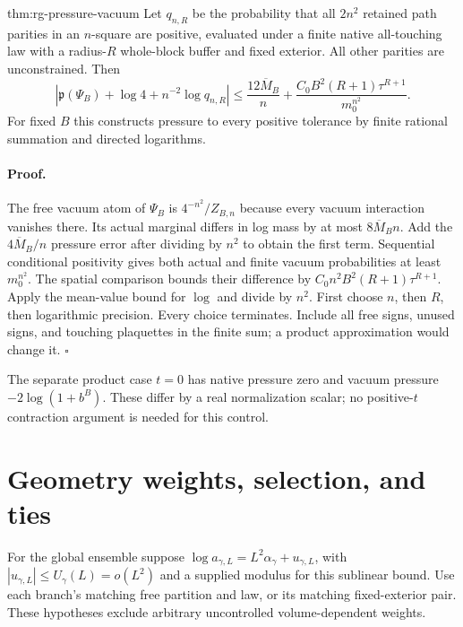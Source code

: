 {thm:rg-pressure-vacuum}
Let $q_{n,R}$ be the probability that all $2n^2$ retained path parities
in an $n$-square are positive, evaluated under a finite native all-touching
law with a radius-$R$ whole-block buffer and fixed exterior. All other
parities are unconstrained. Then
\begin{equation}
 \left|\mathfrak p(\Psi_B)+\log4+n^{-2}\log q_{n,R}\right|
 \leq\frac{12\overline M_B}{n}
       +\frac{C_0B^2(R+1)\tau^{R+1}}{m_0^{n^2}}.
 \label{eq:rg-pressure-vacuum-oracle}
\end{equation}
For fixed $B$ this constructs pressure to every positive tolerance by
finite rational summation and directed logarithms. 

\paragraph{Proof.}
The free vacuum atom of $\Psi_B$ is $4^{-n^2}/Z_{B,n}$ because every
vacuum interaction vanishes there. Its actual marginal differs in log
mass by at most $8\overline M_Bn$. Add the $4\overline M_B/n$ pressure
error after dividing by $n^2$ to obtain the first term. Sequential
conditional positivity gives both actual and finite vacuum probabilities
at least $m_0^{n^2}$. The spatial comparison bounds their difference by
$C_0n^2B^2(R+1)\tau^{R+1}$. Apply the mean-value bound for $\log$ and
divide by $n^2$. First choose $n$, then $R$, then logarithmic precision.
Every choice terminates. Include all free signs, unused signs, and touching
plaquettes in the finite sum; a product approximation would change it.
$\square$

The separate product case $t=0$ has native pressure zero and vacuum
pressure $-2\log(1+b^B)$. These differ by a real normalization scalar;
no positive-$t$ contraction argument is needed for this control.

\section{Geometry weights, selection, and ties}
\label{sec:rg-pressure-selection}

For the global ensemble suppose
$\log a_{\gamma,L}=L^2\alpha_\gamma+u_{\gamma,L}$, with
$|u_{\gamma,L}|\leq U_\gamma(L)=o(L^2)$ and a supplied modulus for this
sublinear bound. Use each branch's matching free partition and law, or
its matching fixed-exterior pair. These hypotheses exclude arbitrary
uncontrolled volume-dependent weights. 

